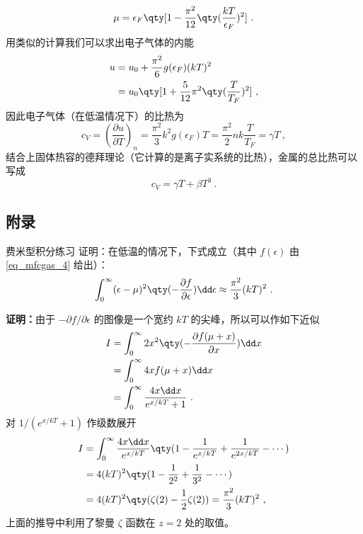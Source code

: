 \begin{equation}
\mu=\epsilon_F\qty[1-\frac{\pi^2}{12}\qty(\frac{kT}{\epsilon_F})^2]~.
\end{equation}
用类似的计算我们可以求出电子气体的内能
\begin{equation}
\begin{aligned}
u&=u_0+\frac{\pi^2}{6}g(\epsilon_F)(kT)^2\\
&=u_0\qty[1+\frac{5}{12}\pi^2\qty(\frac{T}{T_F})^2]~,
\end{aligned}
\end{equation}
因此电子气体（在低温情况下）的比热为
\begin{equation}
c_V=\left(\frac{\partial u}{\partial T}\right)_n=\frac{\pi^2}{3}k^2 g(\epsilon_F) T =\frac{\pi^2}{2}nk\frac{T}{T_F}= \gamma T~,
\end{equation}
结合上固体热容的德拜理论（它计算的是离子实系统的比热），金属的总比热可以写成
\begin{equation}
c_V=\gamma T+\beta T^3~.
\end{equation}
\subsection{附录}
\begin{lemma}{费米型积分练习}\label{lem_mfcgas_1}
证明：在低温的情况下，下式成立（其中 $f(\epsilon)$ 由 \autoref{eq_mfcgas_4} 给出）：
\begin{equation}
\int_0^\infty (\epsilon-\mu)^2 \qty(-\frac{\partial f}{\partial \epsilon})\dd\epsilon
\approx\frac{\pi^2}{3}(kT)^2~.
\end{equation}


\textbf{证明：}由于 $-\partial f/\partial \epsilon$ 的图像是一个宽约 $k T$ 的尖峰，所以可以作如下近似
\begin{equation}
\begin{aligned}
I&=\int_0^\infty 2x^2 \qty(-\frac{\partial f(\mu+x)}{\partial x}) \dd x\\
&=\int_0^\infty 4x f(\mu+x) \dd x\\
&=\int_0^\infty \frac{4x\dd x}{e^{x/kT}+1}~.
\end{aligned}
\end{equation}
对 $1/(e^{x/kT}+1)$ 作级数展开
\begin{equation}
\begin{aligned}
I&=\int_0^\infty \frac{4x\dd x}{e^{x/kT}}\qty(1-\frac{1}{e^{x/kT}}+\frac{1}{e^{2x/kT}}-\cdots)\\
&=4(kT)^2 \qty(1-\frac{1}{2^2}+\frac{1}{3^2}-\cdots)\\
&=4(kT)^2 \qty(\zeta(2)-\frac{1}{2}\zeta(2))=\frac{\pi^2}{3}(kT)^2~,
\end{aligned}
\end{equation}
上面的推导中利用了黎曼 $\zeta$ 函数在 $z=2$ 处的取值。
\end{lemma}